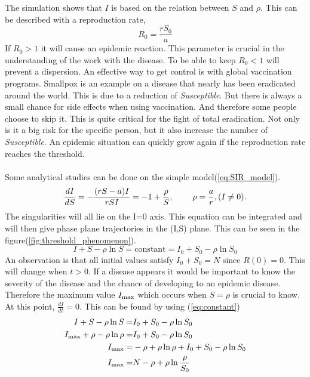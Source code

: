 \documentclass[%
twoside,                 %
final,                   %
10pt]{article}
\begin{document}
The simulation shows that $I$ is based on the relation between $S$ and $\rho$. This can be described with a reproduction rate,
\begin{equation}
R_0 = \frac{rS_0}{a}
\end{equation}
If $R_0 > 1$ it will cause an epidemic reaction. This parameter is crucial in the understanding of the work with the disease. To be able to keep $R_0 < 1$ will prevent a dispersion. An effective way to get control is with global vaccination programs. Smallpox is an example on a disease that nearly has been eradicated around the world. This is due to a reduction of \emph{Susceptible}. But there is always a small chance for side effects when using vaccination. And therefore some people choose to skip it. This is quite critical for the fight of total eradication. Not only is it a big risk for the specific person, but it also increase the number of \emph{Susceptible}. An epidemic situation can quickly grow again if the reproduction rate reaches the threshold.
\\
\\
Some analytical studies can be done on the simple model(\ref{eq:SIR_model}).
\begin{equation} 
\frac{dI}{dS} = -\frac{(rS-a)I}{rSI} = -1 + \frac{\rho}{S},\hspace{8mm}\rho=\frac{a}{r}, (I\neq0).
\end{equation}
The singularities will all lie on the I=0 axis. This equation can be integrated and will then give phase plane trajectories in the (I,S) plane. This can be seen in the figure(\ref{fig:threshold_phenomenon}).
\begin{equation} \label{eq:constant}
I+S-\rho \ln S = \textrm{constant} = I_0 + S_0 - \rho \ln S_0
\end{equation}
An observation is that all initial values satisfy $I_0+S_0=N$ since $R(0) = 0$. This will change when $t>0$. If a disease appears it would be important to know the severity of the disease and the chance of developing to an epidemic disease. Therefore the maximum value $I_{\textrm{max}}$ which occurs when $S=\rho$ is crucial to know. At this point, $\frac{dI}{dt}=0$. This can be found by using (\ref{eq:constant})
\begin{align} 
I+S-\rho \ln S =& I_0 + S_0 - \rho \ln S_0 \nonumber \\
I_{\textrm{max}}+\rho-\rho \ln \rho =& I_0 + S_0 - \rho \ln S_0\nonumber \\
I_{\textrm{max}}=&- \rho+\rho \ln \rho + I_0 + S_0 - \rho \ln S_0\nonumber \\
I_{\textrm{max}}=&N - \rho + \rho \ln\frac{\rho}{S_0} \label{eq:max_I}
\end{align}
\end{document}
